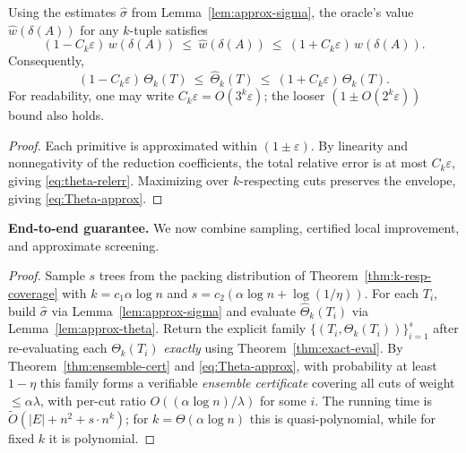 \documentclass[11pt,letterpaper]{article}
\begin{document}
\begin{lemma}
\label{lem:approx-theta}
Using the estimates $\hat\sigma$ from Lemma~\ref{lem:approx-sigma}, the oracle’s value $\hat w(\delta(A))$ for any $k$-tuple satisfies
\begin{equation}\label{eq:theta-relerr}
(1 - C_k\varepsilon)\, w(\delta(A)) \ \le\  \hat w(\delta(A)) \ \le\ (1 + C_k\varepsilon)\, w(\delta(A)).
\end{equation}
Consequently,
\begin{equation}\label{eq:Theta-approx}
(1 - C_k\varepsilon)\,\Theta_k(T) \ \le\ \hat\Theta_k(T)\ \le\ (1 + C_k\varepsilon)\,\Theta_k(T).
\end{equation}
For readability, one may write $C_k\varepsilon=O(3^{k}\varepsilon)$; the looser $(1\pm O(2^{k}\varepsilon))$ bound also holds.
\end{lemma}

\begin{proof}
Each primitive is approximated within $(1\pm\varepsilon)$.
By linearity and nonnegativity of the reduction coefficients, the total relative error is at most $C_k\varepsilon$, giving \eqref{eq:theta-relerr}.
Maximizing over $k$-respecting cuts preserves the envelope, giving \eqref{eq:Theta-approx}.
\end{proof}

\medskip
\noindent\textbf{End-to-end guarantee.}
We now combine sampling, certified local improvement, and approximate screening.

\endtoend*

\begin{proof}
Sample $s$ trees from the packing distribution of Theorem~\ref{thm:k-resp-coverage} with $k=c_1\alpha\log n$ and $s=c_2(\alpha\log n+\log(1/\eta))$.
For each $T_i$, build $\hat\sigma$ via Lemma~\ref{lem:approx-sigma} and evaluate $\hat\Theta_k(T_i)$ via Lemma~\ref{lem:approx-theta}.
Return the explicit family $\{(T_i,\Theta_k(T_i))\}_{i=1}^s$ after re-evaluating each $\Theta_k(T_i)$ \emph{exactly} using Theorem~\ref{thm:exact-eval}.
By Theorem~\ref{thm:ensemble-cert} and \eqref{eq:Theta-approx}, with probability at least $1-\eta$ this family forms a verifiable \emph{ensemble certificate} covering all cuts of weight $\le \alpha\lambda$, with per-cut ratio $O((\alpha\log n)/\lambda)$ for some $i$.
The running time is $\tilde O(|E|+n^2+s\cdot n^k)$; for $k=\Theta(\alpha\log n)$ this is quasi-polynomial, while for fixed $k$ it is polynomial.
\end{proof}
\end{document}

